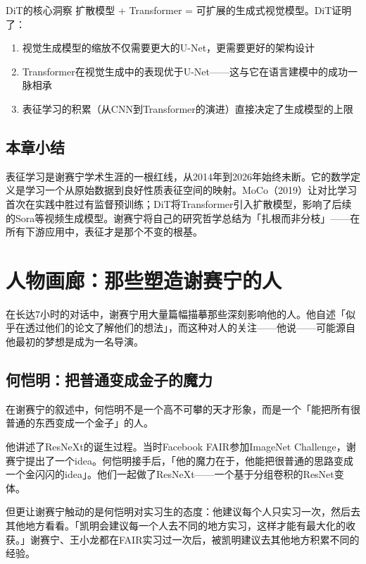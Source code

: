 \documentclass[a4paper]{article}
\begin{document}
\begin{importantbox}{DiT的核心洞察}
扩散模型 + Transformer = 可扩展的生成式视觉模型。DiT证明了：
\begin{enumerate}
  \item 视觉生成模型的缩放不仅需要更大的U-Net，更需要更好的架构设计
  \item Transformer在视觉生成中的表现优于U-Net——这与它在语言建模中的成功一脉相承
  \item 表征学习的积累（从CNN到Transformer的演进）直接决定了生成模型的上限
\end{enumerate}
\end{importantbox}

\subsection{本章小结}
表征学习是谢赛宁学术生涯的一根红线，从2014年到2026年始终未断。它的数学定义是学习一个从原始数据到良好性质表征空间的映射。MoCo（2019）让对比学习首次在实践中胜过有监督预训练；DiT将Transformer引入扩散模型，影响了后续的Sora等视频生成模型。谢赛宁将自己的研究哲学总结为「扎根而非分枝」——在所有下游应用中，表征才是那个不变的根基。

\section{人物画廊：那些塑造谢赛宁的人}

在长达7小时的对话中，谢赛宁用大量篇幅描摹那些深刻影响他的人。他自述「似乎在透过他们的论文了解他们的想法」，而这种对人的关注——他说——可能源自他最初的梦想是成为一名导演。

\subsection{何恺明：把普通变成金子的魔力}

在谢赛宁的叙述中，何恺明不是一个高不可攀的天才形象，而是一个「能把所有很普通的东西变成一个金子」的人。

他讲述了ResNeXt的诞生过程。当时Facebook FAIR参加ImageNet Challenge，谢赛宁提出了一个idea。何恺明接手后，「他的魔力在于，他能把很普通的思路变成一个金闪闪的idea」。他们一起做了ResNeXt——一个基于分组卷积的ResNet变体。

但更让谢赛宁触动的是何恺明对实习生的态度：他建议每个人只实习一次，然后去其他地方看看。「凯明会建议每一个人去不同的地方实习，这样才能有最大化的收获。」谢赛宁、王小龙都在FAIR实习过一次后，被凯明建议去其他地方积累不同的经验。
\end{document}
